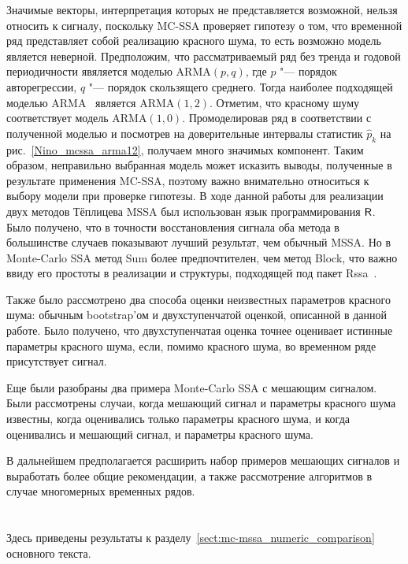 \documentclass[specialist,
substylefile = spbu_report.rtx,
subf,href,colorlinks=true, 12pt]{disser}
\theoremstyle{definition}
\begin{document}
Значимые векторы, интерпретация которых не представляется возможной, нельзя относить к сигналу, поскольку MC-SSA проверяет гипотезу о том, что временной ряд представляет собой реализацию красного шума, то есть возможно модель является неверной. Предположим, что рассматриваемый ряд без тренда и годовой периодичности явяляется моделью ARMA$(p, q)$, где $p$ "--- порядок авторегрессии, $q$ "--- порядок скользящего среднего. Тогда наиболее подходящей моделью ARMA~\cite{auto.arima} является ARMA$(1, 2)$. Отметим, что красному шуму соответствует модель ARMA$(1, 0)$. Промоделировав ряд в соответствии с полученной моделью и посмотрев на доверительные интервалы статистик $\hat p_k$ на рис.~\ref{Nino_mcssa_arma12}, получаем много значимых компонент. Таким образом, неправильно выбранная модель может исказить выводы, полученные в результате применения MC-SSA, поэтому важно внимательно относиться к выбору модели при проверке гипотезы.
\conclusion
В ходе данной работы для реализации двух методов Тёплицева MSSA был использован язык программирования $\mathsf{R}$. Было получено, что в точности восстановления сигнала оба метода в большинстве случаев показывают лучший результат, чем обычный MSSA. Но в Monte-Carlo SSA метод Sum более предпочтителен, чем метод Block, что важно ввиду его простоты в реализации и структуры, подходящей под пакет Rssa~\cite{Rssa}.

Также было рассмотрено два способа оценки неизвестных параметров красного шума: обычным bootstrap'ом и двухступенчатой оценкой, описанной в данной работе. Было получено, что двухступенчатая оценка точнее оценивает истинные параметры красного шума, если, помимо красного шума, во временном ряде присутствует сигнал.

Еще были разобраны два примера Monte-Carlo SSA с мешающим сигналом. Были рассмотрены случаи, когда мешающий сигнал и параметры красного шума известны, когда оценивались только параметры красного шума, и когда оценивались и мешающий сигнал, и параметры красного шума.

В дальнейшем предполагается расширить набор примеров мешающих сигналов и выработать более общие рекомендации, а также рассмотрение алгоритмов в случае многомерных временных рядов.




\appendix

\chapter{}
Здесь приведены результаты к разделу~\ref{sect:mc-mssa_numeric_comparison} основного текста.
\end{document}
